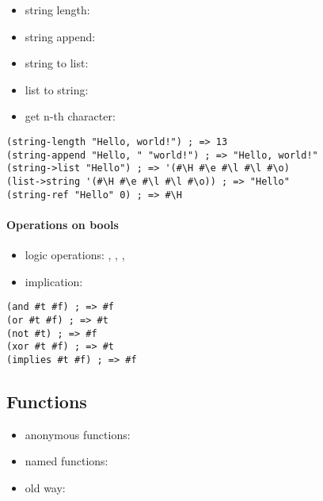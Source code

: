 \documentclass[a4paper,landscape,10pt]{article}
\begin{document}
\begin{multicols*}{2}
  \begin{itemize}
    \item string length: 
    \item string append: 
    \item string to list: 
    \item list to string: 
    \item get n-th character: 
  \end{itemize}

  \begin{lstlisting}[language=Racket]
(string-length "Hello, world!") ; => 13
(string-append "Hello, " "world!") ; => "Hello, world!"
(string->list "Hello") ; => '(#\H #\e #\l #\l #\o)
(list->string '(#\H #\e #\l #\l #\o)) ; => "Hello"
(string-ref "Hello" 0) ; => #\H
\end{lstlisting}

  \paragraph{Operations on bools}

  \begin{itemize}
    \item logic operations: , , , 
    \item implication: 
  \end{itemize}

  \begin{lstlisting}[language=Racket]
(and #t #f) ; => #f
(or #t #f) ; => #t
(not #t) ; => #f
(xor #t #f) ; => #t
(implies #t #f) ; => #f
\end{lstlisting}

  \subsection{Functions}

  \begin{itemize}
    \item anonymous functions: 
    \item named functions: 
    \item old way: 
  \end{itemize}


\end{multicols*}
\end{document}
